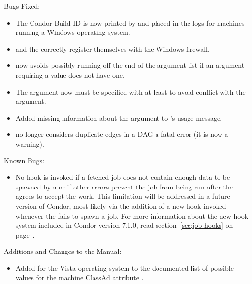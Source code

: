 \noindent Bugs Fixed:

\begin{itemize}

\item The Condor Build ID is now printed by  and placed 
  in the logs for machines running a Windows operating system.

\item {} and the  correctly register 
  themselves with the Windows firewall.

\item {} now avoids possibly running off the end
of the argument list if an argument requiring a value does not have one.

\item The   argument now must be
specified with at least  to avoid conflict with the
 argument.

\item Added missing information about the  argument to
's usage message.

\item {} no longer considers duplicate edges in a DAG a
fatal error (it is now a warning).

\end{itemize}

\noindent Known Bugs:

\begin{itemize}

\item No hook is invoked if a fetched job does not contain enough data
  to be spawned by a  or if other errors prevent the
  job from being run after the  agrees to accept the
  work.
  This limitation will be addressed in a future version of Condor,
  most likely via the addition of a new hook invoked whenever the
   fails to spawn a job.
  For more information about the new hook system included in Condor
  version 7.1.0, read section~\ref{sec:job-hooks} on
  page~\pageref{sec:job-hooks}.

\end{itemize}

\noindent Additions and Changes to the Manual:

\begin{itemize}

\item Added  for the Vista operating system to
  the documented list of possible values for the machine ClassAd
  attribute .

\end{itemize}
